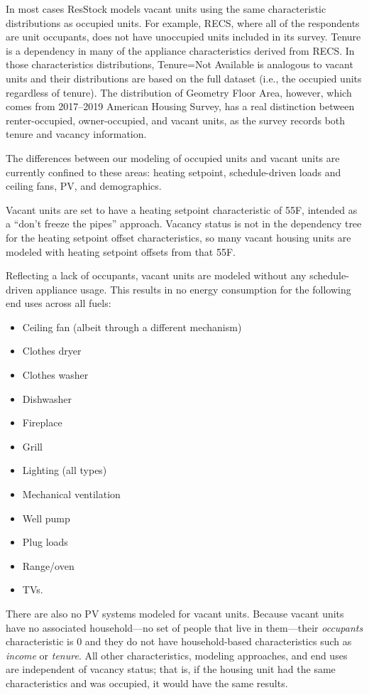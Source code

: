 In most cases ResStock models vacant units using the same characteristic distributions as occupied units. For example, RECS, where all of the respondents are unit occupants, does not have unoccupied units included in its survey. Tenure is a dependency in many of the appliance characteristics derived from RECS. In those characteristics distributions, Tenure=Not Available is analogous to vacant units and their distributions are based on the full dataset (i.e., the occupied units regardless of tenure). The distribution of Geometry Floor Area, however, which comes from 2017--2019 American Housing Survey, has a real distinction between renter-occupied, owner-occupied, and vacant units, as the survey records both tenure and vacancy information.

The differences between our modeling of occupied units and vacant units are currently confined to these areas: heating setpoint, schedule-driven loads and ceiling fans, PV, and demographics.

Vacant units are set to have a heating setpoint characteristic of 55\degree F, intended as a ``don't freeze the pipes'' approach. Vacancy status is not in the dependency tree for the heating setpoint offset characteristics, so many vacant housing units are modeled with heating setpoint offsets from that 55\degree F.

Reflecting a lack of occupants, vacant units are modeled without any schedule-driven appliance usage. This results in no energy consumption for the following end uses across all fuels:
\begin{itemize}
    \item Ceiling fan (albeit through a different mechanism)
    \item Clothes dryer
    \item Clothes washer
    \item Dishwasher
    \item Fireplace
    \item Grill
    \item Lighting (all types)
    \item Mechanical ventilation
    \item Well pump
    \item Plug loads
    \item Range/oven
    \item TVs.
\end{itemize}

There are also no PV systems modeled for vacant units. Because vacant units have no associated household---no set of people that live in them---their \textit{occupants} characteristic is 0 and they do not have household-based characteristics such as \textit{income} or \textit{tenure}. All other characteristics, modeling approaches, and end uses are independent of vacancy status; that is, if the housing unit had the same characteristics and was occupied, it would have the same results.


